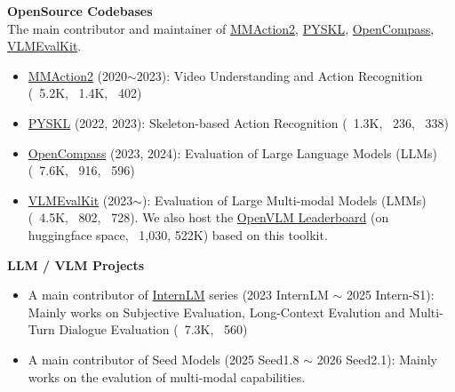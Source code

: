 \documentclass{resume}
\begin{document}
\textbf{OpenSource Codebases} \\
The main contributor and maintainer of \href{https://github.com/open-mmlab/mmaction2}{MMAction2}, \href{https://github.com/kennymckormick/pyskl}{PYSKL}, \href{https://github.com/open-compass/OpenCompass}{OpenCompass}, \href{https://github.com/open-compass/VLMEvalKit}{VLMEvalKit}.  \\

\vspace{-4mm}

\begin{itemize}[parsep=0.5ex]
\item \href{https://github.com/open-mmlab/mmaction2}{MMAction2} (2020$\sim$2023): Video Understanding and Action Recognition (\faStar \  5.2K, \faCodeFork \ 1.4K, \faBarChart \ 402)
\item \href{https://github.com/kennymckormick/pyskl}{PYSKL} (2022, 2023): Skeleton-based Action Recognition (\faStar \  1.3K, \faCodeFork \ 236, \faBarChart \ 338)
\item \href{https://github.com/open-compass/OpenCompass}{OpenCompass} (2023, 2024): Evaluation of Large Language Models (LLMs) (\faStar \  7.6K, \faCodeFork \ 916, \faBarChart \ 596)
\item \href{https://github.com/open-compass/VLMEvalKit}{VLMEvalKit} (2023$\sim$): Evaluation of Large Multi-modal Models (LMMs) (\faStar \  4.5K, \faCodeFork \ 802, \faBarChart \ 728). We also host the \href{https://huggingface.co/spaces/opencompass/open_vlm_leaderboard}{OpenVLM Leaderboard} (on huggingface space, \faHeart \ 1,030, \faMousePointer 522K) based on this toolkit.
\end{itemize}

\vspace{3mm}

\textbf{LLM / VLM Projects} \\

\vspace{-4mm}

\begin{itemize}[parsep=0.5ex]
\item A main contributor of \href{https://github.com/InternLM/InternLM}{InternLM} series (2023 InternLM $\sim$ 2025 Intern-S1): Mainly works on Subjective Evaluation, Long-Context Evalution and Multi-Turn Dialogue Evaluation (\faStar \  7.3K, \faBarChart \ 560)
\item A main contributor of Seed Models (2025 Seed1.8 $\sim$ 2026 Seed2.1): Mainly works on the evalution of multi-modal capabilities.

\end{itemize}
\end{document}
